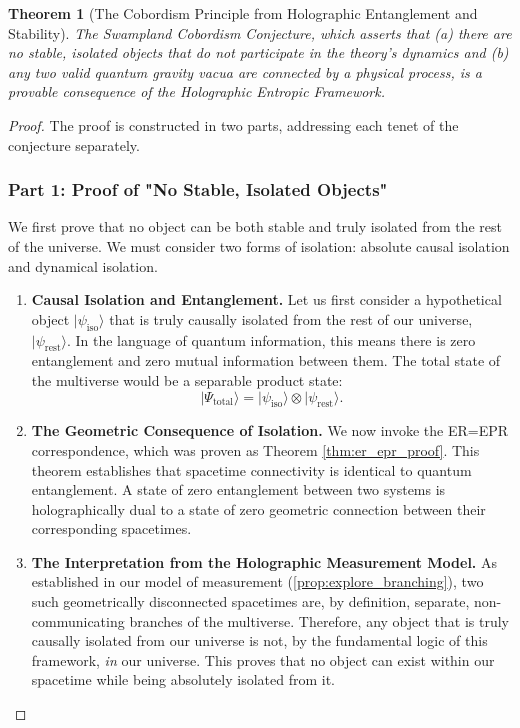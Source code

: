 \documentclass[11pt, letterpaper]{report}
\theoremstyle{plain} %
\newtheorem{theorem}{Theorem}[chapter]
\theoremstyle{definition} %
\theoremstyle{remark} %
\begin{document}
\begin{theorem}[The Cobordism Principle from Holographic Entanglement and Stability]
\label{thm:scc_is_theorem}
The Swampland Cobordism Conjecture, which asserts that (a) there are no stable, isolated objects that do not participate in the theory's dynamics and (b) any two valid quantum gravity vacua are connected by a physical process, is a provable consequence of the Holographic Entropic Framework.
\end{theorem}
\begin{proof}
The proof is constructed in two parts, addressing each tenet of the conjecture separately.

\subsubsection*{Part 1: Proof of "No Stable, Isolated Objects"}

We first prove that no object can be both stable and truly isolated from the rest of the universe. We must consider two forms of isolation: absolute causal isolation and dynamical isolation.

\begin{enumerate}
    \item \textbf{Causal Isolation and Entanglement.} Let us first consider a hypothetical object $|\psi_{\text{iso}}\rangle$ that is truly causally isolated from the rest of our universe, $|\psi_{\text{rest}}\rangle$. In the language of quantum information, this means there is zero entanglement and zero mutual information between them. The total state of the multiverse would be a separable product state:
    \begin{equation}
        |\Psi_{\text{total}}\rangle = |\psi_{\text{iso}}\rangle \otimes |\psi_{\text{rest}}\rangle.
    \end{equation}

    \item \textbf{The Geometric Consequence of Isolation.} We now invoke the ER=EPR correspondence, which was proven as Theorem \ref{thm:er_epr_proof}. This theorem establishes that spacetime connectivity is identical to quantum entanglement. A state of zero entanglement between two systems is holographically dual to a state of zero geometric connection between their corresponding spacetimes.

    \item \textbf{The Interpretation from the Holographic Measurement Model.} As established in our model of measurement (\cref{prop:explore_branching}), two such geometrically disconnected spacetimes are, by definition, separate, non-communicating branches of the multiverse. Therefore, any object that is truly causally isolated from our universe is not, by the fundamental logic of this framework, \textit{in} our universe. This proves that no object can exist within our spacetime while being absolutely isolated from it.


\end{enumerate}
\end{proof}
\end{document}
